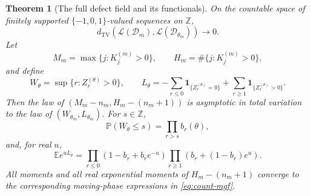 \documentclass[11pt,a4paper]{article}
\numberwithin{equation}{section}
\newtheorem{theorem}{Theorem}[section]
\theoremstyle{definition}
\theoremstyle{remark}
\newcommand{\E}{\mathbb E}
\newcommand{\PP}{\mathbb P}
\newcommand{\Z}{\mathbb Z}
\newcommand{\Law}{\mathcal L}
\newcommand{\TV}{d_{\mathrm{TV}}}
\newcommand{\ind}{\mathbf 1}
\begin{document}
\begin{theorem}[The full defect field and its functionals]
\label{thm:defect-tv}
On the countable space of finitely supported $\{-1,0,1\}$-valued
sequences on $\Z$,
\begin{equation}
\TV(\Law(\mathcal D_m),\Law(\mathcal D_{\theta_m}))\longrightarrow0.
\label{eq:defect-tv}
\end{equation}
Let
\[
M_m=\max\{j:K_j^{(m)}>0\},\qquad
H_m=\#\{j:K_j^{(m)}>0\},
\]
and define
\begin{equation}
W_\theta=\sup\{r:Z_r^{(\theta)}>0\},\qquad
L_\theta=-\sum_{r\le0}\ind_{\{Z_r^{(\theta)}=0\}}
 +\sum_{r\ge1}\ind_{\{Z_r^{(\theta)}>0\}}.
\label{eq:frontier-functionals}
\end{equation}
Then the law of $(M_m-n_m,H_m-(n_m+1))$ is asymptotic in total variation
to the law of $(W_{\theta_m},L_{\theta_m})$. For $s\in\Z$,
\begin{equation}
\PP(W_\theta\le s)=\prod_{r>s}b_r(\theta),
\label{eq:max-cdf}
\end{equation}
and, for real $u$,
\begin{equation}
\E e^{uL_\theta}
=\prod_{r\le0}(1-b_r+b_re^{-u})
 \prod_{r\ge1}(b_r+(1-b_r)e^u).
\label{eq:count-mgf}
\end{equation}
All moments and all real exponential moments of $H_m-(n_m+1)$ converge
to the corresponding moving-phase expressions in \cref{eq:count-mgf}.
\end{theorem}
\end{document}
